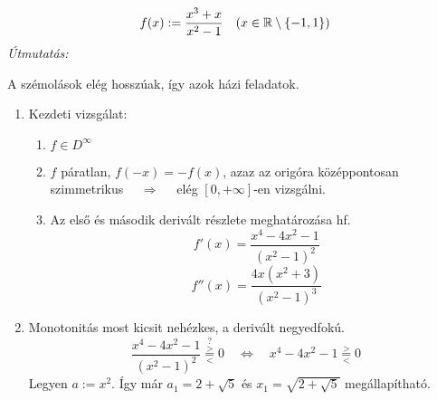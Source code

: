 \documentclass[a4paper,11.5pt]{article}
\begin{document}
	\begin{task}
		\[ f(x):=\frac{x^3+x}{x^2-1}\quad (x\in\mathbb{R}\setminus\{-1,1\}) \]
		\textit{Útmutatás:}
		
		A szémolások elég hosszúak, így azok házi feladatok.
		\begin{enumerate}
			\item Kezdeti vizsgálat:
			\begin{enumerate}
				\item $f\in D^\infty$
				\item $f$ páratlan, $f(-x)=-f(x)$, azaz az origóra középpontosan szimmetrikus $\quad \Rightarrow\quad $ elég $[0,+\infty]$-en vizsgálni.
				\item Az első és második derivált részlete meghatározása hf.
				\[ f'(x)=\frac{x^4-4x^2-1}{(x^2-1)^2} \]
				\[ f''(x)=\frac{4x(x^2+3)}{(x^2-1)^3} \]
			\end{enumerate}
			\item Monotonitás most kicsit nehézkes, a derivált negyedfokú.
			\[ \frac{x^4-4x^2-1}{(x^2-1)^2} \overset{?}{\overset{>}{\underset{<}{=}}}0\quad \Leftrightarrow\quad x^4-4x^2-1 \overset{>}{\underset{<}{=}}0 \]
			Legyen $a:=x^2$. Így már $a_1=2+\sqrt{5}$ és $x_1=\sqrt{2+\sqrt{5}}$ megállapítható.
			

\end{enumerate}
\end{task}
\end{document}
